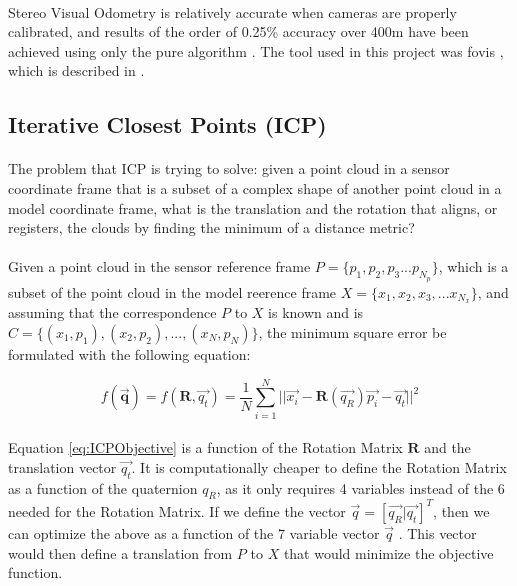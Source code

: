 \documentclass[11pt]{article}
\begin{document}
	\paragraph{}
	Stereo Visual Odometry is relatively accurate when cameras are properly calibrated, and results of the order of 0.25\% accuracy over 400m have been achieved using only the pure algorithm \cite{StereoVis1}. The tool used in this project was fovis \cite{fovis}, which is described in \cite{VisualOdometry}.
	
	\subsection{Iterative Closest Points (ICP)}
	\paragraph{}
	The problem that ICP is trying to solve: given a point cloud in a sensor coordinate frame that is a subset of a complex shape of another point cloud in a model coordinate frame, what is the translation and the rotation that aligns, or registers, the clouds by finding the minimum of a distance metric?
	
	\paragraph{}
	Given a point cloud in the sensor reference frame $P = \{p_1, p_2, p_3 ... p_{N_p}\}$, which is a subset of the point cloud in the model reerence frame $X = \{x_1, x_2, x_3, ... x_{N_x}\}$, and assuming that the correspondence $P$ to $X$ is known and is $C = \{(x_1,p_1), (x_2,p_2), ... , (x_N, p_N)\}$, the minimum square error be formulated with the following equation:
	
	\begin{equation}
	f(\mathbf{\overrightarrow{q}}) = f(\mathbf{R},\overrightarrow{q_t}) = \frac{1}{N}\sum_{i=1}^{N}{||\overrightarrow{x_i}-\mathbf{R}(\overrightarrow{q_R})\overrightarrow{p_i}-\overrightarrow{q_t}||^{2}} 	
	\label{eq:ICPObjective}
	\end{equation}		
	
	\paragraph{}
	Equation \ref{eq:ICPObjective} is a function of the Rotation Matrix $\mathbf{R}$ and the translation vector $\overrightarrow{q_t}$. It is computationally cheaper to define the Rotation Matrix as a function of the quaternion $q_R$, as it only requires 4 variables instead of the 6 needed for the Rotation Matrix. If we define the vector $\overrightarrow{q} = [\overrightarrow{q_R} | \overrightarrow{q_t}]^T$, then we can optimize the above as a function of the 7 variable vector $\overrightarrow{q}$ \cite{AMethodRegistration}. This vector would then define a translation from $P$ to $X$ that would minimize the objective function.
	
\end{document}
